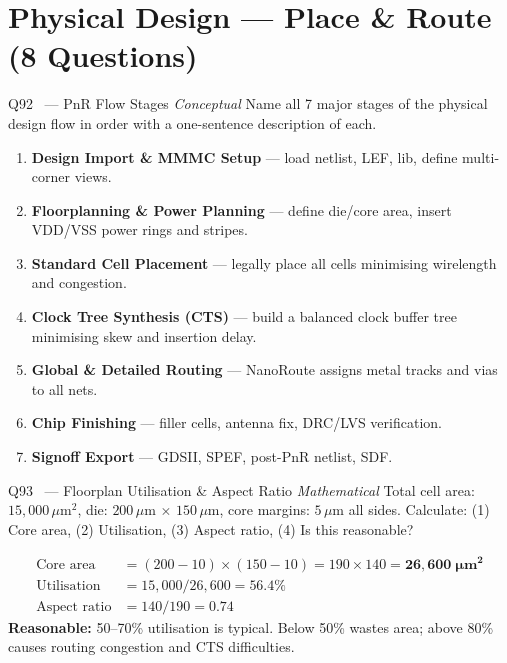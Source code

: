 \documentclass[12pt,a4paper]{article}
\newcommand{\advanced}{%
  \fbox{\textcolor{advred}{\bfseries\sffamily\small ADVANCED}}}
\newcommand{\moderate}{%
  \fbox{\textcolor{modoran}{\bfseries\sffamily\small MODERATE}}}
\begin{document}
\section{Physical Design --- Place \& Route (8 Questions)}
\label{sec:pnr}

\begin{questionbox}{Q92 \moderate\ --- PnR Flow Stages \hfill\textit{Conceptual}}
Name all 7 major stages of the physical design flow in order with a one-sentence description of each.
\end{questionbox}

\begin{answerbox}
\begin{enumerate}
  \item \textbf{Design Import \& MMMC Setup} --- load netlist, LEF, lib, define multi-corner views.
  \item \textbf{Floorplanning \& Power Planning} --- define die/core area, insert VDD/VSS power rings and stripes.
  \item \textbf{Standard Cell Placement} --- legally place all cells minimising wirelength and congestion.
  \item \textbf{Clock Tree Synthesis (CTS)} --- build a balanced clock buffer tree minimising skew and insertion delay.
  \item \textbf{Global \& Detailed Routing} --- NanoRoute assigns metal tracks and vias to all nets.
  \item \textbf{Chip Finishing} --- filler cells, antenna fix, DRC/LVS verification.
  \item \textbf{Signoff Export} --- GDSII, SPEF, post-PnR netlist, SDF.
\end{enumerate}
\end{answerbox}

\begin{questionbox}{Q93 \advanced\ --- Floorplan Utilisation \& Aspect Ratio \hfill\textit{Mathematical}}
Total cell area: $15{,}000\,\mu\text{m}^2$, die: $200\,\mu\text{m}$ $\times$ $150\,\mu\text{m}$, core margins: $5\,\mu\text{m}$ all sides.
Calculate: (1) Core area, (2) Utilisation, (3) Aspect ratio, (4) Is this reasonable?
\end{questionbox}

\begin{answerbox}
\begin{align*}
\text{Core area} &= (200-10)\times(150-10) = 190\times140 = \mathbf{26{,}600\;\mu m^2}\\
\text{Utilisation} &= 15{,}000/26{,}600 = \mathbf{56.4\%}\\
\text{Aspect ratio} &= 140/190 = \mathbf{0.74}
\end{align*}
\textbf{Reasonable:} 50--70\% utilisation is typical. Below 50\% wastes area; above 80\% causes routing congestion and CTS difficulties.
\end{answerbox}
\end{document}
